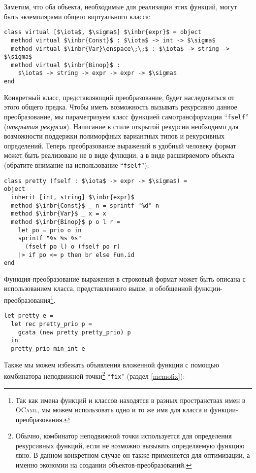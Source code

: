 
Заметим, что оба объекта, необходимые для реализации этих функций, могут быть экземплярами общего виртуального класса:

\begin{lstlisting}
class virtual [$\iota$, $\sigma$] $\inbr{expr}$ = object
  method virtual $\inbr{Const}$ : $\iota$ -> int -> $\sigma$
  method virtual $\inbr{Var}\enspace\;\;$ : $\iota$ -> string -> $\sigma$
  method virtual $\inbr{Binop}$ :
    $\iota$ -> string -> expr -> expr -> $\sigma$  
end
\end{lstlisting}

Конкретный класс, представляющий преобразование, будет наследоваться от этого общего предка. Чтобы иметь возможность 
вызывать рекурсивно данное преобразование, мы параметризуем класс функцией самотрансформации ``\lstinline{fself}'' 
(\emph{открытая рекурсия}). 
Написание в стиле открытой рекурсии необходимо для возможности поддержки полиморфных вариантных типов и рекурсивных определений.
Теперь преобразование выражений в удобный человеку формат может быть реализовано не в виде функции, а в виде расширяемого объекта  (обратите внимание на использование ``\lstinline{fself}''):

\begin{lstlisting}
class pretty (fself : $\iota$ -> expr -> $\sigma$) = 
object 
  inherit [int, string] $\inbr{expr}$ 
  method $\inbr{Const}$ _ n = sprintf "%d" n
  method $\inbr{Var}$ _ x = x
  method $\inbr{Binop}$ p o l r =
    let po = prio o in
    sprintf "%s %s %s" 
      (fself po l) o (fself po r)
    |> if po <= p then br else Fun.id
end
\end{lstlisting}

Функция-преобразование выражения  в строковый  формат может быть  описана с использованием класса, представленного выше, и обобщенной  функции-преобразования\footnote{Так как имена функций и классов находятся в разных пространствах имен в \textsc{OCaml}, мы можем использовать одно и то же имя для класса и функции-преобразования.}.

\begin{lstlisting}
let pretty e =
  let rec pretty_prio p = 
    gcata (new pretty pretty_prio) p 
  in
  pretty_prio min_int e
\end{lstlisting}

Также мы можем избежать объявления вложенной функции с помощью комбинатора неподвижной точки\footnote{Обычно, комбинатор неподвижной точки используется для определения рекурсивных функций, если не возможно вызывать определяемую функцию явно. В данном конкретном случае он также применяется для оптимизации, а именно экономии на создании объектов-преобразований.} ``\lstinline{fix}'' (раздел \ref{memofix}): 

